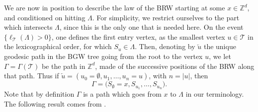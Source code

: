 We are now in position to describe the law of the BRW starting
at some $x\in \mathbb Z^d$, and
conditioned on hitting $\Lambda$.
For simplicity, we restrict ourselves to the part which intersects $\Lambda$,
since this is the only one that is needed here.
On the event $\{\ell_{\mathcal T}(\Lambda)>0\}$,
one defines the first entry vertex, as the smallest vertex
$u\in \mathcal T$ in the lexicographical order, for which $S_u\in \Lambda$.
Then, denoting by $\overleftarrow{u}$
the unique geodesic path in the BGW tree going from the root to
the vertex $u$, we let $\Gamma=\Gamma(\mathcal T)$
be the path in $\mathbb Z^d$,
made of the successive positions of the BRW along that path.
Thus if \hbox{$\overleftarrow{u} = (u_0=\emptyset, u_1,\dots,u_n=u)$},
with $n=|u|$, then
\[
\Gamma=\big(S_\emptyset=x,S_{u_1},\dots,S_{u_n}\big).
\]
Note that by definition $\Gamma$
is a path which goes from $x$ to $\Lambda$ in our terminology.
The following result comes from \cite[Prop.\,2.4]{Zhu3}.

